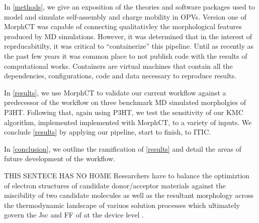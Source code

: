 In \autoref{methods}, we
give an exposition of the theories and software packages used to model and simulate self-assembly and charge mobility in
OPVs. Version one of MorphCT was capable of
connecting qualitativley the morphological features produced by MD simulations. However, it was determined
that in the interest of reprducabitilty, it was critical to ``containerize'' this pipeline. Until as recently as
the past few years it was common place to not publish code with the results of computational works. Containers
are virtual machines that contain all the dependencies, configurations, code and data necessary to reproduce
results. \cite{Cito2016a}


In \autoref{results}, we use MorphCT to validate our current workflow against a predecessor of the 
workflow on three benchmark MD simulated morpholgies of P3HT. 
Following that, again using P3HT, we test the sensitivity of our KMC algorithm, implemented
implemented with MorphCT, to a variety of inputs. We conclude \autoref{results} by applying our pipeline,
start to finish, to ITIC. 

In \autoref{conclusion}, we outline the ramification of \autoref{results} and detail the areas of future
development of the workflow. 

THIS SENTECE HAS NO HOME Researchers have to
balance the optimiztion of electron structures of candidate donor/acceptor materials against the miscibility
of two candidate molecules as well as the resultant morphology across the thermodynamic landscape of
variuos solution processes which ultimately govern the Jsc and FF of at the device level \cite{Zhu2020a}. 
